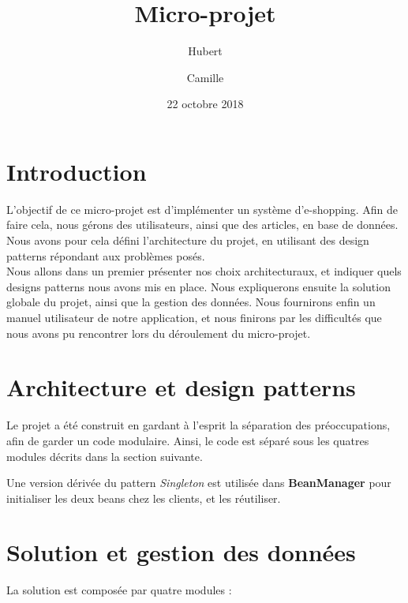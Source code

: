 \documentclass[12pt]{article}
\title{Micro-projet}
\author{Hubert \bsc{Hirtz} \and Camille \bsc{Schnell}}
\date{22 octobre 2018}
\begin{document}
\maketitle
\renewcommand{\contentsname}{Sommaire}
\tableofcontents
\newpage
\section{Introduction}
  L'objectif de ce micro-projet est d'implémenter un système d'e-shopping. Afin de faire cela, nous gérons des utilisateurs, ainsi que des articles, en base de données. Nous avons pour cela défini l'architecture du projet, en utilisant des design patterns répondant aux problèmes posés. \\
  Nous allons dans un premier présenter nos choix architecturaux, et indiquer quels designs patterns nous avons mis en place. Nous expliquerons ensuite la solution globale du projet, ainsi que la gestion des données. Nous fournirons enfin un manuel utilisateur de notre application, et nous finirons par les difficultés que nous avons pu rencontrer lors du déroulement du micro-projet.
\newpage
\section{Architecture et design patterns}

Le projet a été construit en gardant à l'esprit la séparation des préoccupations, afin de garder un code modulaire.
Ainsi, le code est séparé sous les quatres modules décrits dans la section suivante.

Une version dérivée du pattern \textit{Singleton} est utilisée dans \textbf{BeanManager} pour initialiser les deux beans chez les clients, et les réutiliser.

\section{Solution et gestion des données}

La solution est composée par quatre modules :
\end{document}
